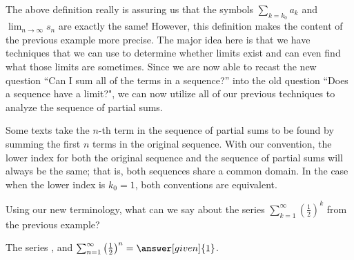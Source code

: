 \documentclass{ximera}
\begin{document}
The above definition really is assuring us that the symbols $\sum_{k=k_0} a_k$ and $\lim_{n \to \infty} s_n$ are exactly the same! However, this definition makes the content of the previous example more precise.  The major idea here is that we have techniques that we can use to determine whether limits exist and can even find what those limits are sometimes.  Since we are now able to recast the new question ``Can I sum all of the terms in a sequence?'' into the old question ``Does a sequence have a limit?", we can now utilize all of our previous techniques to analyze the sequence of partial sums.

\begin{remark}
Some texts take the $n$-th term in the sequence of partial sums to be found by summing the first $n$ terms in the original sequence.  With our convention, the lower index for both the original sequence and the sequence of partial sums will always be the same; that is, both sequences share a common domain.  In the case when the lower index is $k_0=1$, both conventions are equivalent.
\end{remark}

\begin{question}
  Using our new terminology, what can we say about the series $\sum_{k=1}^\infty \left(\frac{1}{2}\right)^k$ from the previous example?  \begin{prompt}The series     , and
      $\sum_{n=1}^\infty \left(\frac{1}{2}\right)^n = \answer[given]{1}$.
  \end{prompt}
\end{question}
%
%
%
\end{document}
